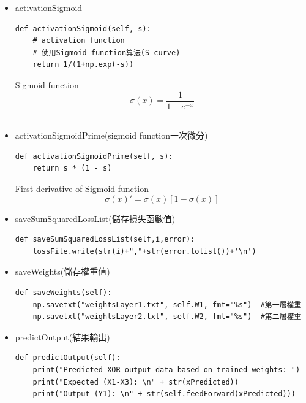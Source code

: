 \documentclass[12pt, a4paper]{article}
\begin{document}
\begin{itemize}
\item activationSigmoid\\
\begin{lstlisting}
def activationSigmoid(self, s):
    # activation function
    # 使用Sigmoid function算法(S-curve)
    return 1/(1+np.exp(-s))
\end{lstlisting}
Sigmoid function 
$$\sigma(x)=\frac{1}{1-e^{-x}}$$\\
\end{itemize}

\begin{itemize}
\item activationSigmoidPrime(sigmoid function一次微分)\\
\begin{lstlisting}
def activationSigmoidPrime(self, s):
    return s * (1 - s)
\end{lstlisting}
\href{https://towardsdatascience.com/derivative-of-the-sigmoid-function-536880cf918e}{\underline{First derivative of Sigmoid function}}
$$\sigma(x)'=\sigma(x)[1-\sigma(x)]$$
\end{itemize}

\begin{itemize}
\item saveSumSquaredLossList(儲存損失函數值)\\
\begin{lstlisting}
def saveSumSquaredLossList(self,i,error):
    lossFile.write(str(i)+","+str(error.tolist())+'\n')
\end{lstlisting}
\end{itemize}

\begin{itemize}
\item saveWeights(儲存權重值)\\
\begin{lstlisting}
def saveWeights(self):
    np.savetxt("weightsLayer1.txt", self.W1, fmt="%s")  #第一層權重
    np.savetxt("weightsLayer2.txt", self.W2, fmt="%s")  #第二層權重
\end{lstlisting}
\end{itemize}

\begin{itemize}
\item predictOutput(結果輸出)\\
\begin{lstlisting}
def predictOutput(self):
    print("Predicted XOR output data based on trained weights: ")
    print("Expected (X1-X3): \n" + str(xPredicted))
    print("Output (Y1): \n" + str(self.feedForward(xPredicted)))
\end{lstlisting}
\end{itemize}
\end{document}

